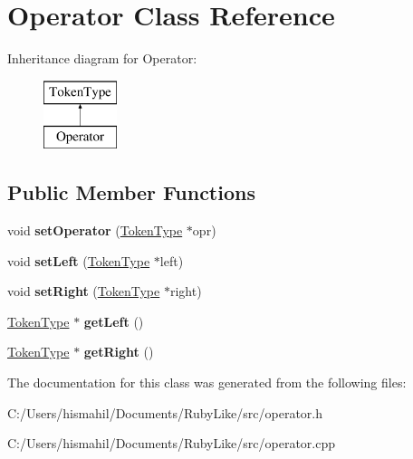 \hypertarget{class_operator}{\section{Operator Class Reference}
\label{class_operator}
}
Inheritance diagram for Operator\-:\begin{figure}[H]
\begin{center}
\leavevmode
\includegraphics[height=2.000000cm]{class_operator}
\end{center}
\end{figure}
\subsection*{Public Member Functions}
\begin{DoxyCompactItemize}
\item 
\hypertarget{class_operator_aa115e40a7b4bb634472e28a1daad410f}{void {\bfseries set\-Operator} (\hyperlink{class_token_type}{Token\-Type} $\ast$opr)}\label{class_operator_aa115e40a7b4bb634472e28a1daad410f}

\item 
\hypertarget{class_operator_ac37299186464e9dfe8557391e679fbf6}{void {\bfseries set\-Left} (\hyperlink{class_token_type}{Token\-Type} $\ast$left)}\label{class_operator_ac37299186464e9dfe8557391e679fbf6}

\item 
\hypertarget{class_operator_a79b4dd10947277fa71a3e57508d5cf4f}{void {\bfseries set\-Right} (\hyperlink{class_token_type}{Token\-Type} $\ast$right)}\label{class_operator_a79b4dd10947277fa71a3e57508d5cf4f}

\item 
\hypertarget{class_operator_acb61fc8562334b90eed92b067d603188}{\hyperlink{class_token_type}{Token\-Type} $\ast$ {\bfseries get\-Left} ()}\label{class_operator_acb61fc8562334b90eed92b067d603188}

\item 
\hypertarget{class_operator_a7a32321aaa7c0b8f54101f46361b20fd}{\hyperlink{class_token_type}{Token\-Type} $\ast$ {\bfseries get\-Right} ()}\label{class_operator_a7a32321aaa7c0b8f54101f46361b20fd}

\end{DoxyCompactItemize}


The documentation for this class was generated from the following files\-:\begin{DoxyCompactItemize}
\item 
C\-:/\-Users/hismahil/\-Documents/\-Ruby\-Like/src/operator.\-h\item 
C\-:/\-Users/hismahil/\-Documents/\-Ruby\-Like/src/operator.\-cpp\end{DoxyCompactItemize}
